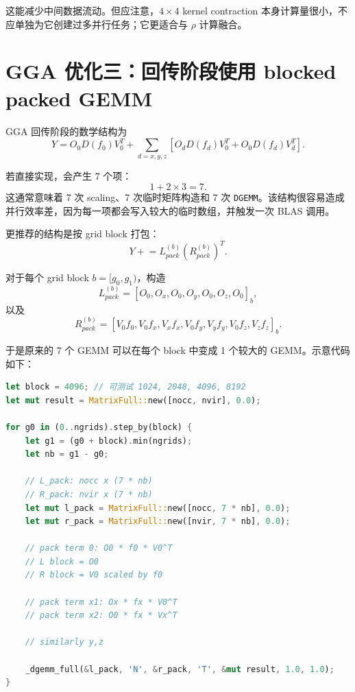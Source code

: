 \documentclass[11pt,a4paper]{ctexart}
\begin{document}
这能减少中间数据流动。但应注意，$4\times4$ kernel contraction 本身计算量很小，不应单独为它创建过多并行任务；它更适合与 $\rho$ 计算融合。

\section{GGA 优化三：回传阶段使用 blocked packed GEMM}

GGA 回传阶段的数学结构为
\begin{equation}
  Y = O_0 D(f_0)V_0^T
  + \sum_{d=x,y,z}\left[O_dD(f_d)V_0^T + O_0D(f_d)V_d^T\right].
\end{equation}

若直接实现，会产生 7 个项：
\begin{equation}
  1 + 2\times 3 = 7.
\end{equation}
这通常意味着 7 次 scaling、7 次临时矩阵构造和 7 次 \texttt{DGEMM}。该结构很容易造成并行效率差，因为每一项都会写入较大的临时数组，并触发一次 BLAS 调用。

更推荐的结构是按 grid block 打包：
\begin{equation}
  Y \mathrel{+}= L_{pack}^{(b)} \left(R_{pack}^{(b)}\right)^T.
\end{equation}

对于每个 grid block $b=[g_0,g_1)$，构造
\begin{equation}
  L_{pack}^{(b)}=[O_0, O_x, O_0, O_y, O_0, O_z, O_0]_{b},
\end{equation}
以及
\begin{equation}
  R_{pack}^{(b)}=[V_0f_0, V_0f_x, V_xf_x, V_0f_y, V_yf_y, V_0f_z, V_zf_z]_{b}.
\end{equation}

于是原来的 7 个 GEMM 可以在每个 block 中变成 1 个较大的 GEMM。示意代码如下：

\begin{lstlisting}[language=Rust,style=code]
let block = 4096; // 可测试 1024, 2048, 4096, 8192
let mut result = MatrixFull::new([nocc, nvir], 0.0);

for g0 in (0..ngrids).step_by(block) {
    let g1 = (g0 + block).min(ngrids);
    let nb = g1 - g0;

    // L_pack: nocc x (7 * nb)
    // R_pack: nvir x (7 * nb)
    let mut l_pack = MatrixFull::new([nocc, 7 * nb], 0.0);
    let mut r_pack = MatrixFull::new([nvir, 7 * nb], 0.0);

    // pack term 0: O0 * f0 * V0^T
    // L block = O0
    // R block = V0 scaled by f0

    // pack term x1: Ox * fx * V0^T
    // pack term x2: O0 * fx * Vx^T

    // similarly y,z

    _dgemm_full(&l_pack, 'N', &r_pack, 'T', &mut result, 1.0, 1.0);
}
\end{lstlisting}
\end{document}
